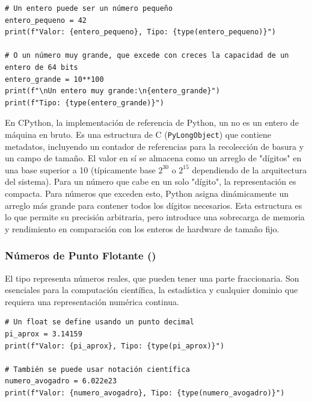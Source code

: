 \text{ }\begin{verbatim}
# Un entero puede ser un número pequeño
entero_pequeno = 42
print(f"Valor: {entero_pequeno}, Tipo: {type(entero_pequeno)}")

# O un número muy grande, que excede con creces la capacidad de un entero de 64 bits
entero_grande = 10**100
print(f"\nUn entero muy grande:\n{entero_grande}")
print(f"Tipo: {type(entero_grande)}")
\end{verbatim}

\begin{remark}
En CPython, la implementación de referencia de Python, un  no es un entero de máquina en bruto. Es una estructura de C (\texttt{PyLongObject}) que contiene metadatos, incluyendo un contador de referencias para la recolección de basura y un campo de tamaño. El valor en sí se almacena como un arreglo de "dígitos" en una base superior a 10 (típicamente base $2^{30}$ o $2^{15}$ dependiendo de la arquitectura del sistema). Para un número que cabe en un solo "dígito", la representación es compacta. Para números que exceden esto, Python asigna dinámicamente un arreglo más grande para contener todos los dígitos necesarios. Esta estructura es lo que permite su precisión arbitraria, pero introduce una sobrecarga de memoria y rendimiento en comparación con los enteros de hardware de tamaño fijo.
\end{remark}

\subsubsection*{Números de Punto Flotante ()}
El tipo  representa números reales, que pueden tener una parte fraccionaria. Son esenciales para la computación científica, la estadística y cualquier dominio que requiera una representación numérica continua.

\text{ }\begin{verbatim}
# Un float se define usando un punto decimal
pi_aprox = 3.14159
print(f"Valor: {pi_aprox}, Tipo: {type(pi_aprox)}")

# También se puede usar notación científica
numero_avogadro = 6.022e23
print(f"Valor: {numero_avogadro}, Tipo: {type(numero_avogadro)}")
\end{verbatim}

